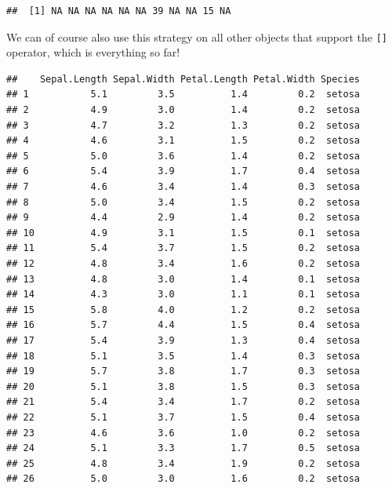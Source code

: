 \documentclass[
]{book}
\newenvironment{Shaded}{\begin{snugshade}}{\end{snugshade}}
\newcommand{\CommentTok}[1]{\textcolor[rgb]{0.56,0.35,0.01}{\textit{#1}}}
\newcommand{\NormalTok}[1]{#1}
\newcommand{\OperatorTok}[1]{\textcolor[rgb]{0.81,0.36,0.00}{\textbf{#1}}}
\newcommand{\StringTok}[1]{\textcolor[rgb]{0.31,0.60,0.02}{#1}}
\begin{document}
\begin{verbatim}
##  [1] NA NA NA NA NA NA 39 NA NA 15 NA
\end{verbatim}

We can of course also use this strategy on all other objects that support the \texttt{{[}{]}} operator, which is everything so far!

\begin{Shaded}
\end{Shaded}

\begin{verbatim}
##    Sepal.Length Sepal.Width Petal.Length Petal.Width Species
## 1           5.1         3.5          1.4         0.2  setosa
## 2           4.9         3.0          1.4         0.2  setosa
## 3           4.7         3.2          1.3         0.2  setosa
## 4           4.6         3.1          1.5         0.2  setosa
## 5           5.0         3.6          1.4         0.2  setosa
## 6           5.4         3.9          1.7         0.4  setosa
## 7           4.6         3.4          1.4         0.3  setosa
## 8           5.0         3.4          1.5         0.2  setosa
## 9           4.4         2.9          1.4         0.2  setosa
## 10          4.9         3.1          1.5         0.1  setosa
## 11          5.4         3.7          1.5         0.2  setosa
## 12          4.8         3.4          1.6         0.2  setosa
## 13          4.8         3.0          1.4         0.1  setosa
## 14          4.3         3.0          1.1         0.1  setosa
## 15          5.8         4.0          1.2         0.2  setosa
## 16          5.7         4.4          1.5         0.4  setosa
## 17          5.4         3.9          1.3         0.4  setosa
## 18          5.1         3.5          1.4         0.3  setosa
## 19          5.7         3.8          1.7         0.3  setosa
## 20          5.1         3.8          1.5         0.3  setosa
## 21          5.4         3.4          1.7         0.2  setosa
## 22          5.1         3.7          1.5         0.4  setosa
## 23          4.6         3.6          1.0         0.2  setosa
## 24          5.1         3.3          1.7         0.5  setosa
## 25          4.8         3.4          1.9         0.2  setosa
## 26          5.0         3.0          1.6         0.2  setosa

\end{verbatim}
\end{document}
